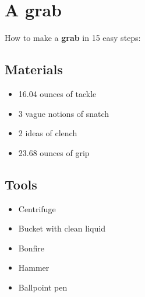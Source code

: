 \documentclass{article}
\begin{document}
\section{A grab}How to make a \textbf{grab} in 15 easy steps:

\subsection{Materials}\begin{itemize}
\item 
16.04 ounces of tackle
\item 
3 vague notions of snatch
\item 
2 ideas of clench
\item 
23.68 ounces of grip
\end{itemize}
\subsection{Tools}\begin{itemize}
\item 
Centrifuge
\item 
Bucket with clean liquid
\item 
Bonfire
\item 
Hammer
\item 
Ballpoint pen
\end{itemize}
\end{document}
